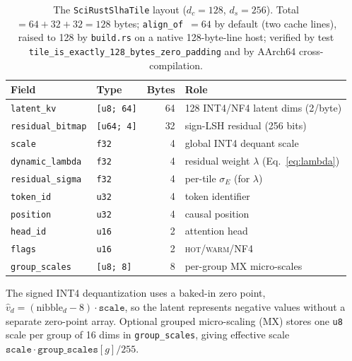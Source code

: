 \documentclass[11pt]{article}
\theoremstyle{plain}
\theoremstyle{definition}
\newcommand{\dc}{d_c}
\newcommand{\ds}{d_s}
\newcommand{\sigE}{\sigma_E}
\begin{document}
\begin{table}[t]
\centering
\caption{The \texttt{SciRustSlhaTile} layout ($\dc=128$, $\ds=256$).
Total $= 64+32+32 = 128$ bytes; \texttt{align\_of}~$=64$ by default (two cache
lines), raised to 128 by \texttt{build.rs} on a native 128-byte-line host;
verified by test \texttt{tile\_is\_exactly\_128\_bytes\_zero\_padding} and by
AArch64 cross-compilation.}
\label{tab:tile}
\small
\begin{tabular}{@{}llr l@{}}
\toprule
Field & Type & Bytes & Role \\
\midrule
\texttt{latent\_kv}       & \texttt{[u8; 64]}  & 64 & 128 INT4/NF4 latent dims (2/byte) \\
\texttt{residual\_bitmap} & \texttt{[u64; 4]}  & 32 & sign-LSH residual (256 bits) \\
\texttt{scale}            & \texttt{f32}       & 4  & global INT4 dequant scale \\
\texttt{dynamic\_lambda}  & \texttt{f32}       & 4  & residual weight $\lambda$ (Eq.~\ref{eq:lambda}) \\
\texttt{residual\_sigma}  & \texttt{f32}       & 4  & per-tile $\sigE$ (for $\lambda$) \\
\texttt{token\_id}        & \texttt{u32}       & 4  & token identifier \\
\texttt{position}         & \texttt{u32}       & 4  & causal position \\
\texttt{head\_id}         & \texttt{u16}       & 2  & attention head \\
\texttt{flags}            & \texttt{u16}       & 2  & \textsc{hot}/\textsc{warm}/NF4 \\
\texttt{group\_scales}    & \texttt{[u8; 8]}   & 8  & per-group MX micro-scales \\
\bottomrule
\end{tabular}
\end{table}

The signed INT4 dequantization uses a baked-in zero point,
$\hat v_d = (\text{nibble}_d - 8)\cdot \texttt{scale}$, so the latent
represents negative values without a separate zero-point array. Optional
grouped micro-scaling (MX) stores one \texttt{u8} scale per group of 16
dims in \texttt{group\_scales}, giving effective scale
$\texttt{scale}\cdot \texttt{group\_scales}[g]/255$.
\end{document}
